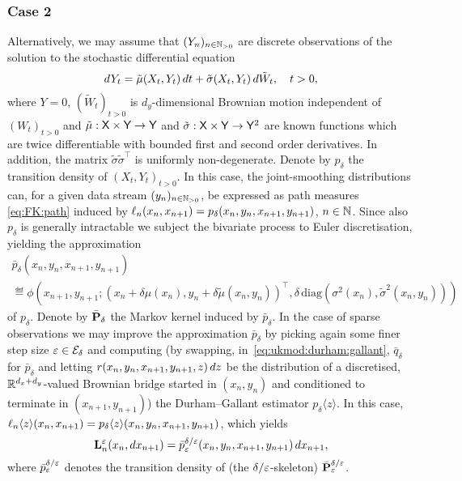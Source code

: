 \begin{example}
\subsubsection*{Case 2} Alternatively, we may assume that $(Y_n)_{n \in \mathbb{N}_{> 0}}$ are discrete observations of the solution to the stochastic differential equation 
$$
d Y_t = \tilde{\mu}(X_t, Y_t) \, d t + \tilde{\sigma}(X_t, Y_t) \, d \tilde{W}_t, \quad t > 0, 
$$
where $Y = 0$, $(\tilde{W}_t)_{t > 0}$ is $d_y$-dimensional Brownian motion independent of $(W_t)_{t > 0}$ and $\tilde{\mu} : \mathsf{X} \times \mathsf{Y} \to \mathsf{Y}$ and $\tilde{\sigma} : \mathsf{X} \times \mathsf{Y} \to \mathsf{Y}^2$ are known functions which are twice differentiable with bounded first and second order derivatives. In addition, the matrix $\tilde{\sigma} \tilde{\sigma}^\intercal$ is uniformly non-degenerate. Denote by $p_\delta$ the transition density of $(X_t, Y_t)_{t > 0}$. In this case, the joint-smoothing distributions can, for a given data stream $(y_n)_{n \in \mathbb{N}_{> 0}}$, be expressed as path measures \eqref{eq:FK:path} induced by $\ell_{n}(x_n, x_{n + 1}) = p_\delta(x_n, y_n, x_{n + 1}, y_{n + 1})$, $n \in \mathbb{N}$. Since also $p_\delta$ is generally intractable we subject the bivariate process to Euler discretisation, yielding the approximation 
\begin{multline}
\bar{p}_\delta(x_n, y_n, x_{n + 1}, y_{n + 1}) \\
\eqdef \phi \left( x_{n + 1}, y_{n + 1}; (x_n + \delta \mu(x_n), y_n + \delta \tilde{\mu}(x_n, y_n))^\intercal, \delta \, \mbox{diag}(\sigma^2(x_n), \tilde{\sigma}^2(x_n, y_n)) \right) \label{eq:td:bivariate:process}
\end{multline}
of $p_\delta$. Denote by $\bar{\mathbf{P}}_\delta$ the Markov kernel induced by $\bar{p}_\delta$. In the case of sparse observations we may improve the approximation $\bar{p}_\delta$ by picking again some finer step size $\varepsilon \in \mathcal{E}_\delta$ and computing (by swapping, in~\eqref{eq:ukmod:durham:gallant}, $\bar{q}_\delta$ for $\bar{p}_\delta$ and letting $r(x_n, y_n, x_{n + 1}, y_{n + 1}, z) \, d z$ be the distribution of a discretised, $\mathbb{R}^{d_x + d_y}$-valued Brownian bridge started in $(x_n, y_n)$ and conditioned to terminate in $(x_{n + 1}, y_{n + 1})$) the Durham--Gallant estimator $p_\delta \langle z \rangle$. In this case, $\ell_{n} \langle z \rangle(x_n, x_{n + 1}) = p_\delta \langle z \rangle (x_n, y_n, x_{n + 1}, y_{n + 1})$, which yields
\begin{equation} \label{eq:ukmod:durham:gallant:case:2}
\ukmod{n}(x_n, \rmd x_{n + 1}) = \bar{p}_\precpar^{\delta / \precpar}(x_n, y_n, x_{n + 1}, y_{n + 1}) \, \rmd x_{n + 1}, 
\end{equation}
where $\bar{p}_\varepsilon^{\delta / \varepsilon}$ denotes the transition density of (the $\delta / \varepsilon$-skeleton) $\bar{\mathbf{P}}_\varepsilon^{\delta / \varepsilon}$.  
\end{example}

